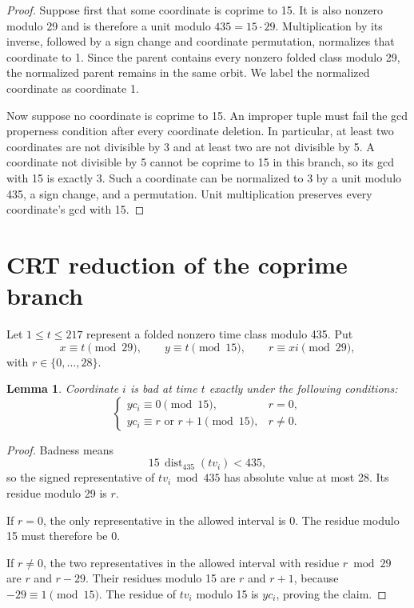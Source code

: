 \documentclass[11pt]{article}
\newtheorem{lemma}[theorem]{Lemma}
\newcommand{\distm}[2]{\operatorname{dist}_{#1}(#2)}
\begin{document}
\begin{proof}
Suppose first that some coordinate is coprime to 15.  It is also nonzero
modulo 29 and is therefore a unit modulo \(435=15\cdot29\).
Multiplication by its inverse, followed by a sign change and coordinate
permutation, normalizes that coordinate to 1.  Since the parent contains
every nonzero folded class modulo 29, the normalized parent remains in the
same orbit.  We label the normalized coordinate as coordinate 1.

Now suppose no coordinate is coprime to 15.  An improper tuple must fail the
gcd properness condition after every coordinate deletion.  In particular,
at least two coordinates are not divisible by 3 and at least two are not
divisible by 5.  A coordinate not divisible by 5 cannot be coprime to 15 in
this branch, so its gcd with 15 is exactly 3.  Such a coordinate can be
normalized to 3 by a unit modulo 435, a sign change, and a permutation.
Unit multiplication preserves every coordinate's gcd with 15.
\end{proof}

\section{CRT reduction of the coprime branch}

Let \(1\leq t\leq217\) represent a folded nonzero time class modulo 435.
Put
\[
  x\equiv t\pmod{29},\qquad
  y\equiv t\pmod{15},\qquad
  r\equiv xi\pmod{29},
\]
with \(r\in\{0,\ldots,28\}\).

\begin{lemma}
\label{lem:crt}
Coordinate \(i\) is bad at time \(t\) exactly under the following
conditions:
\[
  \begin{cases}
  yc_i\equiv0\pmod{15}, & r=0,\\
  yc_i\equiv r\text{ or }r+1\pmod{15}, & r\neq0.
  \end{cases}
\]
\end{lemma}

\begin{proof}
Badness means
\[
  15\,\distm{435}{t v_i}<435,
\]
so the signed representative of \(tv_i\bmod435\) has absolute value at most
28.  Its residue modulo 29 is \(r\).

If \(r=0\), the only representative in the allowed interval is 0.  The
residue modulo 15 must therefore be 0.

If \(r\neq0\), the two representatives in the allowed interval with residue
\(r\bmod29\) are \(r\) and \(r-29\).  Their residues modulo 15 are \(r\)
and \(r+1\), because \(-29\equiv1\pmod{15}\).  The residue of \(tv_i\)
modulo 15 is \(yc_i\), proving the claim.
\end{proof}
\end{document}
